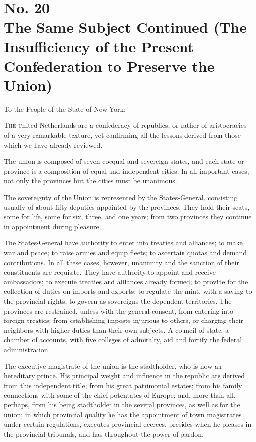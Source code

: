 \chapter[No. 20: The Same Subject Continued (The Insufficiency of the Present Confederation to Preserve the Union)]{No. 20\\ {\small The Same Subject Continued (The Insufficiency of the Present Confederation to Preserve the Union)}}
To the People of the State of New York:
\vspace{.4cm}

\textsc{The u}nited Netherlands are a confederacy of republics, or rather of aristocracies of a very remarkable texture, yet confirming all the lessons derived from those which we have already reviewed.

The union is composed of seven coequal and sovereign states, and each state or province is a composition of equal and independent cities. In all important cases, not only the provinces but the cities must be unanimous.

The sovereignty of the Union is represented by the States-General, consisting usually of about fifty deputies appointed by the provinces. They hold their seats, some for life, some for six, three, and one years; from two provinces they continue in appointment during pleasure.

The States-General have authority to enter into treaties and alliances; to make war and peace; to raise armies and equip fleets; to ascertain quotas and demand contributions. In all these cases, however, unanimity and the sanction of their constituents are requisite. They have authority to appoint and receive ambassadors; to execute treaties and alliances already formed; to provide for the collection of duties on imports and exports; to regulate the mint, with a saving to the provincial rights; to govern as sovereigns the dependent territories. The provinces are restrained, unless with the general consent, from entering into foreign treaties; from establishing imposts injurious to others, or charging their neighbors with higher duties than their own subjects. A council of state, a chamber of accounts, with five colleges of admiralty, aid and fortify the federal administration.

The executive magistrate of the union is the stadtholder, who is now an hereditary prince. His principal weight and influence in the republic are derived from this independent title; from his great patrimonial estates; from his family connections with some of the chief potentates of Europe; and, more than all, perhaps, from his being stadtholder in the several provinces, as well as for the union; in which provincial quality he has the appointment of town magistrates under certain regulations, executes provincial decrees, presides when he pleases in the provincial tribunals, and has throughout the power of pardon.

